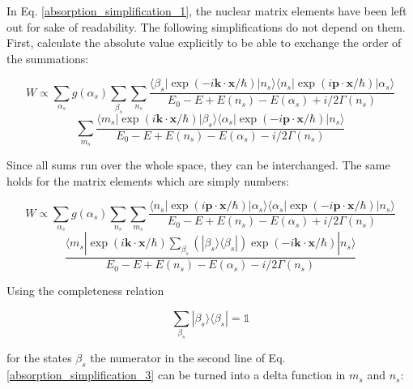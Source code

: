 \documentclass{article}
\begin{document}
In Eq. \ref{absorption_simplification_1}, the nuclear matrix elements have been left out for sake of readability. 
The following simplifications do not depend on them. 
First, calculate the absolute value explicitly to be able to exchange the order of the summations:

\begin{equation}
\label{absorption_simplification_2}
	W \propto \sum_{\alpha_s} g(\alpha_s) \sum_{\beta_s} \sum_{n_s} \frac{ \langle \beta_s | \exp{\left( - i \mathbf{k} \cdot \mathbf{x} / \hbar \right)} | n_s \rangle \langle n_s | \exp{\left( i \mathbf{p} \cdot \mathbf{x} / \hbar \right)} | \alpha_s \rangle  }{E_0 - E + E(n_s) - E(\alpha_s) + i/2 \Gamma(n_s)} 
\end{equation}	
\begin{equation*}
\sum_{m_s} \frac{ \langle m_s | \exp{\left( i \mathbf{k} \cdot \mathbf{x} / \hbar \right)} | \beta_s \rangle \langle \alpha_s | \exp{\left(  - i \mathbf{p} \cdot \mathbf{x} / \hbar \right)} | n_s \rangle  }{E_0 - E + E(n_s) - E(\alpha_s) - i/2 \Gamma(n_s)}
\end{equation*}

Since all sums run over the whole space, they can be interchanged. 
The same holds for the matrix elements which are simply numbers:

\begin{equation}
\label{absorption_simplification_3}
	W \propto \sum_{\alpha_s} g(\alpha_s) \sum_{n_s} \sum_{m_s} \frac{  \langle n_s | \exp{\left( i \mathbf{p} \cdot \mathbf{x} / \hbar \right)} | \alpha_s \rangle \langle \alpha_s | \exp{\left(  - i \mathbf{p} \cdot \mathbf{x} / \hbar \right)} | n_s \rangle  }{E_0 - E + E(n_s) - E(\alpha_s) + i/2 \Gamma(n_s)} 
\end{equation}	
\begin{equation*}
	\frac{ \langle m_s | \exp{\left( i \mathbf{k} \cdot \mathbf{x} / \hbar \right)} \sum_{\beta_s} \left( | \beta_s \rangle \langle \beta_s | \right) \exp{\left( - i \mathbf{k} \cdot \mathbf{x} / \hbar \right)} | n_s \rangle }{E_0 - E + E(n_s) - E(\alpha_s) - i/2 \Gamma(n_s)}
\end{equation*}

Using the completeness relation

\begin{equation}
	\label{completeness_relation_system}
	\sum_{\beta_s} | \beta_s \rangle \langle \beta_s | = \mathbb{1}
\end{equation}

for the states $\beta_s$ the numerator in the second line of Eq. \ref{absorption_simplification_3} can be turned into a delta function in $m_s$ and $n_s$:
\end{document}
